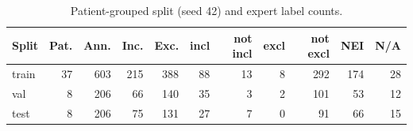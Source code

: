 \begin{table}[t]
\centering
\footnotesize
\caption{Patient-grouped split (seed 42) and expert label counts.}
\label{tab:split}
\begin{tabular}{lrrrrrrrrrr}
\toprule
Split & Pat. & Ann. & Inc. & Exc. & incl & not incl & excl & not excl & NEI & N/A \\
\midrule
train & 37 & 603 & 215 & 388 & 88 & 13 & 8 & 292 & 174 & 28 \\
val & 8 & 206 & 66 & 140 & 35 & 3 & 2 & 101 & 53 & 12 \\
test & 8 & 206 & 75 & 131 & 27 & 7 & 0 & 91 & 66 & 15 \\
\bottomrule
\end{tabular}
\end{table}
